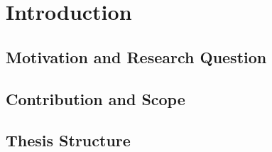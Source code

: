 \documentclass[12pt,a4paper,oneside]{report}
\begin{document}

\chapter{Introduction}
\label{ch:introduction}

\section{Motivation and Research Question}
\label{sec:motivation}

\section{Contribution and Scope}
\label{sec:contribution}

\section{Thesis Structure}
\label{sec:structure}
\end{document}
